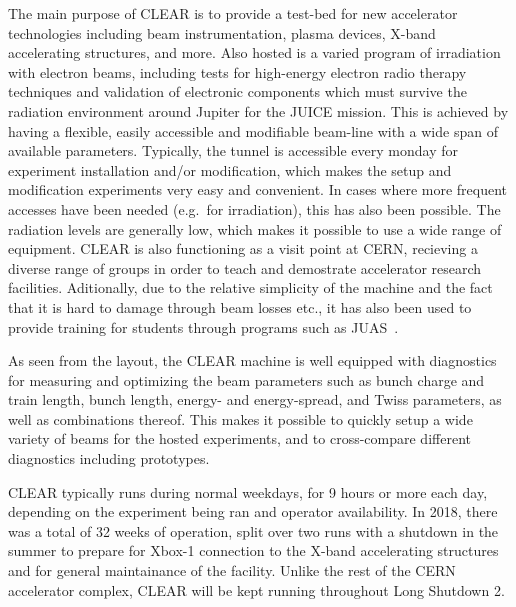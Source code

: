 \documentclass[a4paper,
               keeplastbox,   %
               ]{jacow}
\begin{document}
The main purpose of CLEAR is to provide a test-bed for new accelerator technologies including beam instrumentation, plasma devices, X-band accelerating structures, and more.
Also hosted is a varied program of irradiation with electron beams, including tests for high-energy electron radio therapy techniques and validation of electronic components which must survive the radiation environment around Jupiter for the JUICE mission.
This is achieved by having a flexible, easily accessible and modifiable beam-line with a wide span of available parameters.
Typically, the tunnel is accessible every monday for experiment installation and/or modification, which makes the setup and modification experiments very easy and convenient.
In cases where more frequent accesses have been needed (e.g.\ for irradiation), this has also been possible.
The radiation levels are generally low, which makes it possible to use a wide range of equipment.
CLEAR is also functioning as a visit point at CERN, recieving a diverse range of groups in order to teach and demostrate accelerator research facilities.
Aditionally, due to the relative simplicity of the machine and the fact that it is hard to damage through beam losses etc., it has also been used to provide training for students through programs such as JUAS~\cite{JUAS19}.

As seen from the layout, the CLEAR machine is well equipped with diagnostics~\cite{HelenPHELMA} for measuring and optimizing the beam parameters such as bunch charge and train length, bunch length, energy- and energy-spread, and Twiss parameters, as well as combinations thereof.
This makes it possible to quickly setup a wide variety of beams for the hosted experiments, and to cross-compare different diagnostics including prototypes.

CLEAR typically runs during normal weekdays, for 9 hours or more each day, depending on the experiment being ran and operator availability.
In 2018, there was a total of 32 weeks of operation, split over two runs with a shutdown in the summer to prepare for Xbox-1 connection to the X-band accelerating structures and for general maintainance of the facility.
Unlike the rest of the CERN accelerator complex, CLEAR will be kept running throughout Long Shutdown 2.
\end{document}
